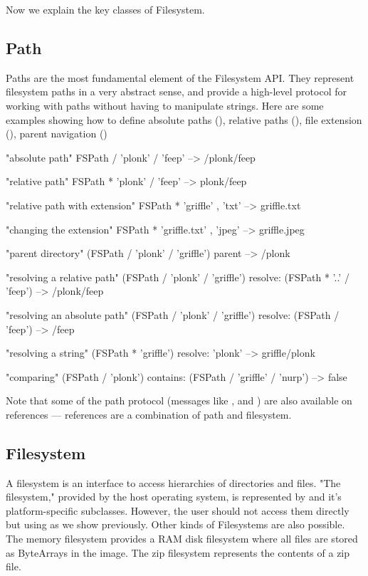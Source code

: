 \documentclass[a4paper,10pt,twoside]{book}
\begin{document}
Now we explain the key classes of Filesystem. 


\subsection{Path}
Paths are the most fundamental element of the Filesystem API. They represent filesystem paths in a very abstract sense, and provide a high-level protocol for working with paths without having to manipulate strings. Here are some examples showing how to 
define absolute paths (), relative paths (), file extension (), parent navigation ()

\begin{code}{}
"absolute path"
FSPath / 'plonk' / 'feep'       --> /plonk/feep
    
"relative path"
FSPath * 'plonk' / 'feep'       --> plonk/feep

"relative path with extension"
FSPath * 'griffle' , 'txt'      --> griffle.txt
    
"changing the extension"
FSPath * 'griffle.txt' , 'jpeg'     --> griffle.jpeg
    
"parent directory"
(FSPath / 'plonk' / 'griffle') parent   --> /plonk
    
"resolving a relative path"
(FSPath / 'plonk' / 'griffle') resolve: (FSPath * '..' / 'feep')
                   --> /plonk/feep
    
"resolving an absolute path"
(FSPath / 'plonk' / 'griffle') resolve: (FSPath / 'feep')
                   --> /feep
                                           
"resolving a string"
(FSPath * 'griffle') resolve: 'plonk'   --> griffle/plonk
                        
"comparing"
(FSPath / 'plonk') contains: (FSPath / 'griffle' / 'nurp')
                     --> false
\end{code}

Note that some of the path protocol (messages like \ct{/},  and ) are also available on references --- references are a combination of path and filesystem. 


\subsection{Filesystem}

A filesystem is an interface to access hierarchies of directories and files. "The filesystem," provided by the host operating system, is represented by  and it's platform-specific subclasses. However, the user should not access them directly but using  as we show previously. Other kinds of Filesystems are also possible. The memory filesystem provides a RAM disk filesystem where all files are stored as ByteArrays in the image. The zip filesystem represents the contents of a zip file.
\end{document}
